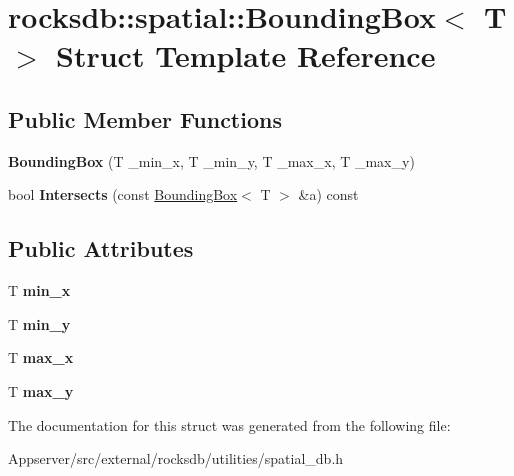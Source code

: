 \hypertarget{structrocksdb_1_1spatial_1_1BoundingBox}{}\section{rocksdb\+:\+:spatial\+:\+:Bounding\+Box$<$ T $>$ Struct Template Reference}
\label{structrocksdb_1_1spatial_1_1BoundingBox}
\subsection*{Public Member Functions}
\begin{DoxyCompactItemize}
\item 
{\bfseries Bounding\+Box} (T \+\_\+min\+\_\+x, T \+\_\+min\+\_\+y, T \+\_\+max\+\_\+x, T \+\_\+max\+\_\+y)\hypertarget{structrocksdb_1_1spatial_1_1BoundingBox_a7ce735b4eecba1f6b2a83651f0b0b9f8}{}\label{structrocksdb_1_1spatial_1_1BoundingBox_a7ce735b4eecba1f6b2a83651f0b0b9f8}

\item 
bool {\bfseries Intersects} (const \hyperlink{structrocksdb_1_1spatial_1_1BoundingBox}{Bounding\+Box}$<$ T $>$ \&a) const\hypertarget{structrocksdb_1_1spatial_1_1BoundingBox_a25981c6ad8bbf6c457955fae70d112fa}{}\label{structrocksdb_1_1spatial_1_1BoundingBox_a25981c6ad8bbf6c457955fae70d112fa}

\end{DoxyCompactItemize}
\subsection*{Public Attributes}
\begin{DoxyCompactItemize}
\item 
T {\bfseries min\+\_\+x}\hypertarget{structrocksdb_1_1spatial_1_1BoundingBox_a26416337084e7b54df9eec78fb9f9439}{}\label{structrocksdb_1_1spatial_1_1BoundingBox_a26416337084e7b54df9eec78fb9f9439}

\item 
T {\bfseries min\+\_\+y}\hypertarget{structrocksdb_1_1spatial_1_1BoundingBox_af3902f573fe67e6ed8550c944c6b4540}{}\label{structrocksdb_1_1spatial_1_1BoundingBox_af3902f573fe67e6ed8550c944c6b4540}

\item 
T {\bfseries max\+\_\+x}\hypertarget{structrocksdb_1_1spatial_1_1BoundingBox_aa19c5cc39d97e71260a71cee09ffa4cf}{}\label{structrocksdb_1_1spatial_1_1BoundingBox_aa19c5cc39d97e71260a71cee09ffa4cf}

\item 
T {\bfseries max\+\_\+y}\hypertarget{structrocksdb_1_1spatial_1_1BoundingBox_aafdfa0fc1ffc2f3b8a3d114b0bf3258d}{}\label{structrocksdb_1_1spatial_1_1BoundingBox_aafdfa0fc1ffc2f3b8a3d114b0bf3258d}

\end{DoxyCompactItemize}


The documentation for this struct was generated from the following file\+:\begin{DoxyCompactItemize}
\item 
Appserver/src/external/rocksdb/utilities/spatial\+\_\+db.\+h\end{DoxyCompactItemize}

